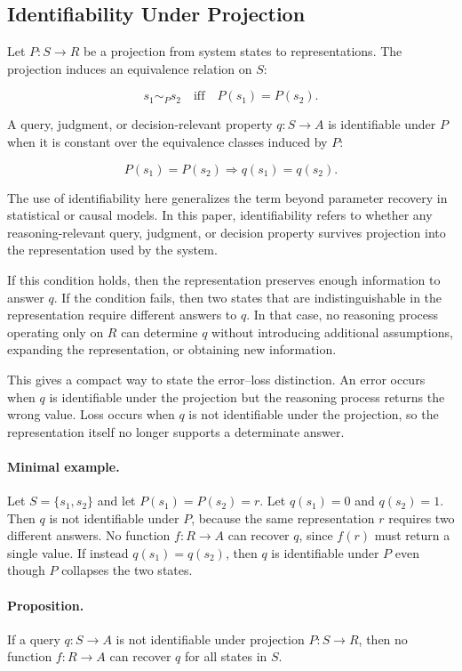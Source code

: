 \documentclass[11pt]{article}
\begin{document}
\subsection{Identifiability Under Projection}

Let $P:S\rightarrow R$ be a projection from system states to representations. The projection induces an equivalence relation on $S$:

\[
s_1 \sim_P s_2 \quad \text{iff} \quad P(s_1)=P(s_2).
\]

A query, judgment, or decision-relevant property $q:S\rightarrow A$ is identifiable under $P$ when it is constant over the equivalence classes induced by $P$:

\[
P(s_1)=P(s_2) \Rightarrow q(s_1)=q(s_2).
\]

The use of identifiability here generalizes the term beyond parameter recovery in statistical or causal models. In this paper, identifiability refers to whether any reasoning-relevant query, judgment, or decision property survives projection into the representation used by the system.

If this condition holds, then the representation preserves enough information to answer $q$. If the condition fails, then two states that are indistinguishable in the representation require different answers to $q$. In that case, no reasoning process operating only on $R$ can determine $q$ without introducing additional assumptions, expanding the representation, or obtaining new information.

This gives a compact way to state the error--loss distinction. An error occurs when $q$ is identifiable under the projection but the reasoning process returns the wrong value. Loss occurs when $q$ is not identifiable under the projection, so the representation itself no longer supports a determinate answer.

\paragraph{Minimal example.}
Let $S=\{s_1,s_2\}$ and let $P(s_1)=P(s_2)=r$. Let $q(s_1)=0$ and $q(s_2)=1$. Then $q$ is not identifiable under $P$, because the same representation $r$ requires two different answers. No function $f:R\rightarrow A$ can recover $q$, since $f(r)$ must return a single value. If instead $q(s_1)=q(s_2)$, then $q$ is identifiable under $P$ even though $P$ collapses the two states.

\paragraph{Proposition.}
If a query $q:S\rightarrow A$ is not identifiable under projection $P:S\rightarrow R$, then no function $f:R\rightarrow A$ can recover $q$ for all states in $S$.
\end{document}
